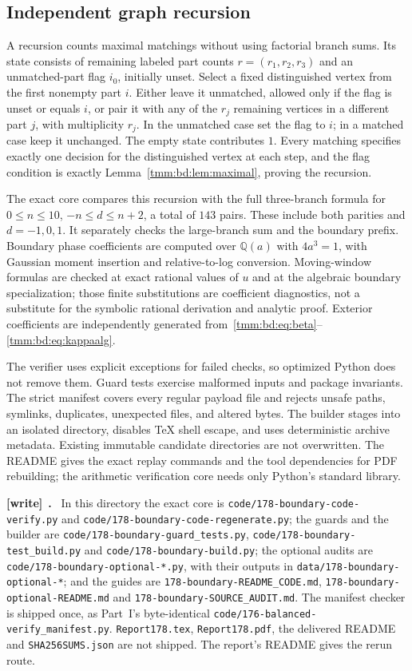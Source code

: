 \documentclass[11pt,letterpaper]{article}
\theoremstyle{remark}\newtheorem{remark}[theorem]{Remark}
\newcommand{\file}[1]{\nolinkurl{#1}}
\newenvironment{writenote}[1][]{\par\smallskip\begingroup\small
 \noindent\textbf{[write]}\if\relax\detokenize{#1}\relax\else~\textbf{#1.}\fi\ }%
 {\par\endgroup\smallskip}
\begin{document}
\subsection{Independent graph recursion}
A recursion counts maximal matchings without using factorial branch sums. Its state consists of remaining labeled part counts $r=(r_1,r_2,r_3)$ and an unmatched-part flag $i_0$, initially unset. Select a fixed distinguished vertex from the first nonempty part $i$. Either leave it unmatched, allowed only if the flag is unset or equals $i$, or pair it with any of the $r_j$ remaining vertices in a different part $j$, with multiplicity $r_j$. In the unmatched case set the flag to $i$; in a matched case keep it unchanged. The empty state contributes $1$. Every matching specifies exactly one decision for the distinguished vertex at each step, and the flag condition is exactly Lemma~\ref{tmm:bd:lem:maximal}, proving the recursion.

The exact core compares this recursion with the full three-branch formula for $0\le n\le10$, $-n\le d\le n+2$, a total of $143$ pairs. These include both parities and $d=-1,0,1$. It separately checks the large-branch sum and the boundary prefix. Boundary phase coefficients are computed over $\mathbb Q(a)$ with $4a^3=1$, with Gaussian moment insertion and relative-to-log conversion. Moving-window formulas are checked at exact rational values of $u$ and at the algebraic boundary specialization; those finite substitutions are coefficient diagnostics, not a substitute for the symbolic rational derivation and analytic proof. Exterior coefficients are independently generated from~\eqref{tmm:bd:eq:beta}--\eqref{tmm:bd:eq:kappaalg}.

The verifier uses explicit exceptions for failed checks, so optimized Python does not remove them. Guard tests exercise malformed inputs and package invariants. The strict manifest covers every regular payload file and rejects unsafe paths, symlinks, duplicates, unexpected files, and altered bytes. The builder stages into an isolated directory, disables TeX shell escape, and uses deterministic archive metadata. Existing immutable candidate directories are not overwritten. The README gives the exact replay commands and the tool dependencies for PDF rebuilding; the arithmetic verification core needs only Python's standard library.
\begin{writenote}
In this directory the exact core is \file{code/178-boundary-code-verify.py} and \file{code/178-boundary-code-regenerate.py}; the guards and the builder are \file{code/178-boundary-guard_tests.py}, \file{code/178-boundary-test_build.py} and \file{code/178-boundary-build.py}; the optional audits are \file{code/178-boundary-optional-*.py}, with their outputs in \file{data/178-boundary-optional-*}; and the guides are \file{178-boundary-README_CODE.md}, \file{178-boundary-optional-README.md} and \file{178-boundary-SOURCE_AUDIT.md}. The manifest checker is shipped once, as Part~I's byte-identical \file{code/176-balanced-verify_manifest.py}. \file{Report178.tex}, \file{Report178.pdf}, the delivered README and \file{SHA256SUMS.json} are not shipped. The report's README gives the rerun route.
\end{writenote}
\end{document}
